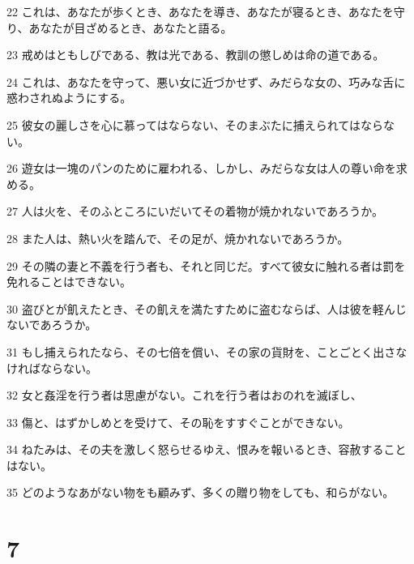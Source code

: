 \par 22 これは、あなたが歩くとき、あなたを導き、あなたが寝るとき、あなたを守り、あなたが目ざめるとき、あなたと語る。
\par 23 戒めはともしびである、教は光である、教訓の懲しめは命の道である。
\par 24 これは、あなたを守って、悪い女に近づかせず、みだらな女の、巧みな舌に惑わされぬようにする。
\par 25 彼女の麗しさを心に慕ってはならない、そのまぶたに捕えられてはならない。
\par 26 遊女は一塊のパンのために雇われる、しかし、みだらな女は人の尊い命を求める。
\par 27 人は火を、そのふところにいだいてその着物が焼かれないであろうか。
\par 28 また人は、熱い火を踏んで、その足が、焼かれないであろうか。
\par 29 その隣の妻と不義を行う者も、それと同じだ。すべて彼女に触れる者は罰を免れることはできない。
\par 30 盗びとが飢えたとき、その飢えを満たすために盗むならば、人は彼を軽んじないであろうか。
\par 31 もし捕えられたなら、その七倍を償い、その家の貨財を、ことごとく出さなければならない。
\par 32 女と姦淫を行う者は思慮がない。これを行う者はおのれを滅ぼし、
\par 33 傷と、はずかしめとを受けて、その恥をすすぐことができない。
\par 34 ねたみは、その夫を激しく怒らせるゆえ、恨みを報いるとき、容赦することはない。
\par 35 どのようなあがない物をも顧みず、多くの贈り物をしても、和らがない。

\chapter{7}

